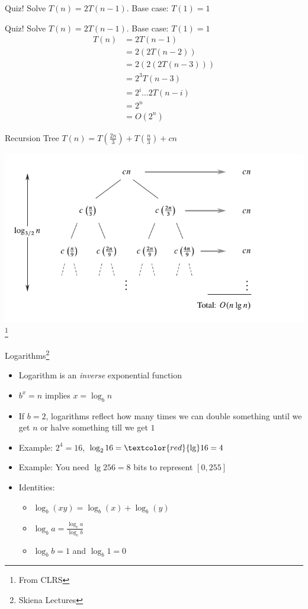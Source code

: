 \documentclass{beamer}
\newcommand{\hred}[1]{{\textcolor{red}{#1}}}
\begin{document}
\begin{frame}{Quiz!}
Solve $T(n) = 2T(n-1)$. Base case: $T(1)=1$ 
\end{frame}


\begin{frame}{Quiz!}
Solve $T(n) = 2T(n-1)$. Base case: $T(1)=1$ 
\begin{align*}
T(n)    &= 2T(n-1) \\
        &= 2( 2T(n-2) ) \\
        &= 2( 2( 2T(n-3))) \\
        &= 2^3 T(n-3) \\
        &= 2^i \ldots 2T(n-i) \\
        &= 2^n \\
        &= O(2^n)
\end{align*}
\end{frame}


\begin{frame}{Recursion Tree}
$T(n) = T(\frac{2n}{3}) + T(\frac{n}{3}) + cn$
\begin{center}
    \includegraphics[scale=0.4]{recursionTree.png}\footnote{From CLRS}
\end{center}
\end{frame}

\begin{frame}{Logarithms\footnote{Skiena Lectures}}
\begin{itemize}
\item Logarithm is an {\em inverse} exponential function
\item $b^x = n$ implies $x=\log_b n$
\item If $b=2$, logarithms reflect how many times we can double something until we get $n$ or halve something till we get $1$
\item Example: $2^4=16$, $\log_2 16 = \hred{\lg } 16 = 4$
\item Example: You need $\lg 256 = 8$ bits to represent $[0,255]$
\item Identities:
\begin{itemize}
    \item $\log_b (xy) = \log_b (x) + \log_b(y)$
    \item $\log_b a = \frac{\log_c a}{\log_c b}$
    \item $\log_b b = 1$ and $\log_b 1 = 0$
\end{itemize}
\end{itemize}
\end{frame}
\end{document}
